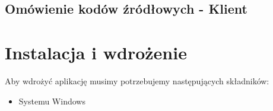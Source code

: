 \documentclass[10pt,titlepage]{article}
\begin{document}
\subsection{Omówienie kodów źródłowych - Klient}

\section{Instalacja i wdrożenie}
Aby wdrożyć aplikację musimy potrzebujemy następujących składników:
\begin{itemize}
  \item Systemu Windows
\end{itemize}

%

%
\end{document}
